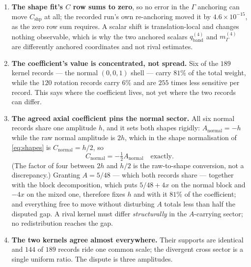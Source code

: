 \documentclass[11pt]{article}
\theoremstyle{plain}
\theoremstyle{definition}
\theoremstyle{remark}
\newcommand{\chk}[1]{}
\begin{document}
\begin{enumerate}\itemsep2pt
\item \textbf{The shape fit's $C$ row sums to zero}, so no error in the
  $\Gamma$ anchoring can move $C_{\mathrm{shp}}$ at all; the recorded run's own
  re-anchoring moved it by $4.6\times10^{-15}$, as the zero row sum requires.
  A scalar shift is translation-local and changes nothing observable, which is
  why the two anchored scalars $q_{\mathrm{band}}^{(4)}$ and
  $m_\Gamma^{(4)}$ are differently anchored coordinates and not rival
  estimates.
\item \textbf{The coefficient's value is concentrated, not spread.} Six of
  the $189$ kernel records --- the normal $(0,0,1)$ shell --- carry $81\%$ of
  the total weight, while the $120$ rotation records carry $6\%$ and are $255$
  times less sensitive per record. This says where the coefficient lives, not
  yet where the two records can differ.
\item \textbf{The agreed axial coefficient pins the normal sector.} All six
  normal records share one amplitude $h$, and it sets both shapes rigidly:
  $A_{\mathrm{normal}}=-h$ while the raw normal amplitude is $2h$, which in the
  shape normalisation of \eqref{eq:shapes} is $C_{\mathrm{normal}}=h/2$, so
  \[
    C_{\mathrm{normal}}=-\tfrac12 A_{\mathrm{normal}}\quad\text{exactly.}
  \]
  (The factor of four between $2h$ and $h/2$ is the raw-to-shape conversion,
  not a discrepancy.) Granting $A=5/48$ --- which both records share --- together
  with the block decomposition, which puts $5/48+4x$ on the normal block and
  $-4x$ on the mixed one, therefore fixes $h$ and with it $81\%$ of the
  coefficient; and everything free to move without disturbing $A$ totals less
  than half the disputed gap. A rival kernel must differ \emph{structurally} in
  the $A$-carrying sector; no redistribution reaches the gap.
\item \textbf{The two kernels agree almost everywhere.} Their supports are
  identical and $144$ of $189$ records ride one common scale; the divergent
  cross sector is a single uniform ratio. The dispute is three amplitudes.
\end{enumerate}
\chk{the shape fit's C row sums to zero, so no Gamma-anchor error can move C\_shp at all}
\chk{a translation-local scalar shift changes nothing observable}
\chk{FINDING: C\_shp is carried by 6 of 189 records, not spread across the kernel}
\chk{FINDING: A = 5/48 pins the normal sector's whole C4 contribution}
\chk{C\_normal = -A\_normal/2: the agreed axial coefficient pins the normal channel}
\chk{the two 189-record kernels agree everywhere except three amplitudes, and the on-site anchor swap moves C by exactly zero}
\end{document}
